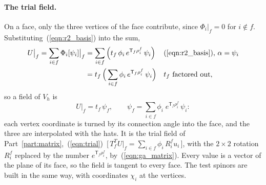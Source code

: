 \paragraph{The trial field.} On a face, only the three vertices of the face contribute, since $\Phi_i|_f = 0$ for $i\notin f$. Substituting~(\ref{eqn:r2_basis}) into the sum,
\begin{align*}
U\big|_f = \sum_{i\in f}\Phi_i[\psi_i]\big|_f &= \sum_{i\in f} \Big(t_f\,\phi_i\, e^{\mathsf T_f\rho_i^f}\,\psi_i\Big) && \text{(\ref{eqn:r2_basis}), } \alpha = \psi_i \\
&= t_f\,\Big(\sum_{i\in f}\phi_i\, e^{\mathsf T_f\rho_i^f}\,\psi_i\Big) && t_f \text{ factored out,}
\end{align*}
so a field of $V_h$ is
\begin{equation}
\label{eqn:ga_trial}
U\big|_f = t_f\, \psi_f, \qquad \psi_f = \sum_{i \in f} \phi_i\; e^{\mathsf T_f \rho_i^f}\, \psi_i :
\end{equation}
each vertex coordinate is turned by its connection angle into the face, and the three are interpolated with the hats. It is the trial field of Part~\ref{part:matrix},~(\ref{eqn:trial})~[\,$T_f^TU|_f = \sum_{i\in f}\phi_i\, R_i^fu_i$\,], with the $2\times 2$ rotation $R_i^f$ replaced by the number $e^{\mathsf T_f\rho_i^f}$, by~(\ref{eqn:ga_matrix}). Every value is a vector of the plane of its face, so the field is tangent to every face. The test spinors are built in the same way, with coordinates $\chi_i$ at the vertices.

